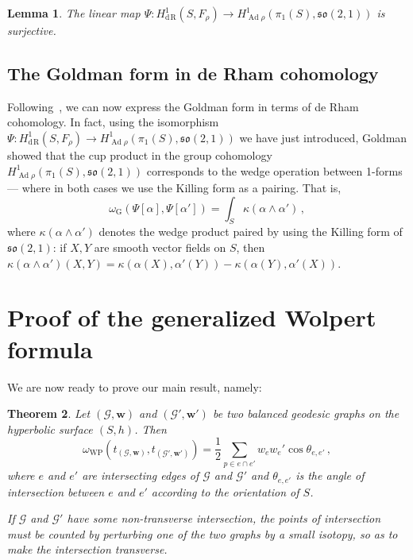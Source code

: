 \documentclass[11pt]{article}
\newtheorem{theo}{Theorem}[section]
\newtheorem{lemm}[theo]{Lemma}
\theoremstyle{definition}
\numberwithin{equation}{section}
\numberwithin{figure}{section}
\numberwithin{table}{section}
\newcommand{\weil}{{\mathrm{W}\!\mathrm{P}}}
\newcommand{\so}{\mathfrak{so}}
\DeclareMathOperator{\Ad}{Ad}
\DeclareMathOperator{\rham}{d\! R}
\begin{document}
\begin{lemm}
The linear map $\Psi:H^1_{\rham}(S,F_\rho)\to H^1_{\Ad\rho}(\pi_1(S),\so(2,1))$ is surjective.
\end{lemm}

\subsection{The Goldman form in de Rham cohomology}

Following~\cite{Goldman}, we can now express the Goldman form in terms of de Rham cohomology. In fact, using the isomorphism $\Psi:H^1_{\rham}(S,F_\rho)\to H^1_{\Ad\rho}(\pi_1(S),\so(2,1))$ we have just introduced, Goldman showed that the cup product in the group cohomology $H^1_{\Ad\rho}(\pi_1(S),\so(2,1))$ corresponds to the wedge operation between 1-forms --- where in both cases we use the Killing form as a pairing. That is,
\begin{equation}\label{eq goldman form in de rham}
\omega_{\mathrm G}\left(\Psi[\alpha],\Psi[\alpha']\right)=\int_S \kappa(\alpha\wedge\alpha')\,,
\end{equation}
where $\kappa(\alpha\wedge\alpha')$ denotes the wedge product paired by using the Killing form of $\so(2,1)$: if $X,Y$ are smooth vector fields on $S$, then $\kappa(\alpha \wedge \alpha')(X,Y)=\kappa(\alpha(X),\alpha'(Y))-\kappa(\alpha(Y),\alpha'(X))$.



\section{Proof of the generalized Wolpert formula}

We are now ready to prove our main result, namely:

\begin{theo}
Let $(\mathcal G,\mathbf w)$ and $(\mathcal G',\mathbf w')$ be two balanced geodesic graphs on the hyperbolic surface $(S,h)$. Then
\[
\omega_\weil\left(t_{(\mathcal G,\mathbf w)},t_{(\mathcal G',\mathbf w')}\right)=\frac{1}{2}\sum_{p\in e\cap e'}w_ew_e'\cos \theta_{e,e'}\,,
\]
where $e$ and $e'$ are intersecting edges of $\mathcal G$ and $\mathcal G'$ and $\theta_{e,e'}$ is the angle of intersection between $e$ and $e'$ according to the orientation of $S$.

If $\mathcal G$ and $\mathcal G'$ have some non-transverse intersection, the points of intersection must be counted by perturbing one of the two graphs by a small isotopy, so as to make the intersection transverse.
\end{theo}
\end{document}
